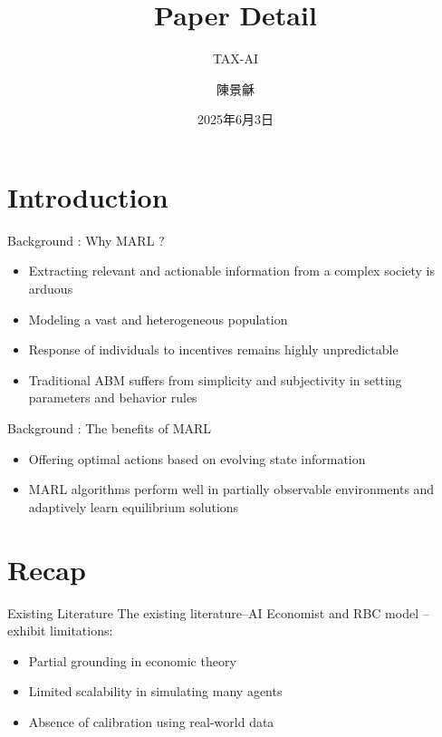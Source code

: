 \documentclass{beamer}
\author{陳景龢}
\title{Paper Detail}
\subtitle{TAX-AI}
\institute[NCCU]{\normalsize Econ Dept\quad NCCU}
\date{2025年6月3日}
\begin{document}
\begin{frame}
  \titlepage
  \begin{figure}[htpb]
    \centering
  \end{figure}
\end{frame}

\begin{frame}
  \tableofcontents[sectionstyle=show,subsectionstyle=show/shaded/hide,subsubsectionstyle=show/shaded/hide]
\end{frame}

\section{Introduction}
\begin{frame}{Background : Why MARL ?}
  \begin{itemize}
    \item Extracting relevant and actionable information from a complex society is arduous
    \item Modeling a vast and heterogeneous population
    \item Response of individuals to incentives remains highly unpredictable
    \item Traditional ABM suffers from simplicity and subjectivity in setting parameters and behavior rules
  \end{itemize}
\end{frame}

\begin{frame}{Background : The benefits of MARL}
  \begin{itemize}
    \item Offering optimal actions based on evolving state information
    \item MARL algorithms perform well in partially observable environments and adaptively learn equilibrium solutions
  \end{itemize}
\end{frame}

\section{Recap}
\begin{frame}{Existing Literature}
  The existing literature--AI Economist \cite{zheng2022ai} and RBC model \cite{curry2022analyzing}--exhibit limitations:
  \begin{itemize}
    \item Partial grounding in economic theory
    \item Limited scalability in simulating many agents
    \item Absence of calibration using real-world data
  \end{itemize}
\end{frame}
\end{document}
